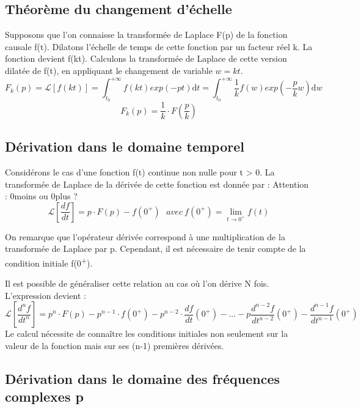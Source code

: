 \documentclass[]{report}
\newcommand{\deriv}{\mathrm{d}}
\begin{document}
	\subsection{Théorème du changement d'échelle}
	
	Supposons que l'on connaisse la transformée de Laplace F(p) de la
	fonction causale f(t). Dilatons l'échelle de temps de cette fonction par
	un facteur réel k. La fonction devient f(kt). Calculons la transformée
	de Laplace de cette version dilatée de f(t), en appliquant le changement
	de variable $w = kt$.
	\begin{equation*}
	F_{k}(p) = \mathcal{L}[f(kt)]=\int_{t_{0}}^{+\infty}f(kt)exp(-pt) \deriv t  =\int_{t_{0}}^{+\infty}\frac{1}{k}f(w)exp(-\frac{p}{k}w) \deriv w 
	\end{equation*}
	\begin{equation}\label{}
	F_{k}(p) = \frac{1}{k}\cdot F(\frac{p}{k})
	\end{equation}
	
	\subsection{Dérivation dans le domaine temporel}
	Considérons le cas d'une fonction f(t) continue non nulle pour t > 0. La transformée de Laplace de la dérivée de cette fonction est donnée par :
	Attention : 0moins ou 0plus ?
	\begin{equation}\label{key}
	\mathcal{L}[\frac{df}{dt}] = p\cdot F(p)-f(0^{+}) ~~~avec~f(0^{+})=\lim_{t\rightarrow0^{+}}f(t)
	\end{equation}

	On remarque que l'opérateur dérivée correspond à une multiplication de
	la transformée de Laplace par p. Cependant, il est nécessaire de tenir
	compte de la condition initiale f(0\textsuperscript{+}).
	
	Il est possible de généraliser cette relation au cas où l'on dérive N
	fois. L'expression devient :
	\begin{equation}\label{key}
	\mathcal{L}[\frac{d^{n}f}{dt^{n}}] = p^{n}\cdot F(p)-p^{n-1}\cdot f(0^{+})-p^{n-2}\cdot \frac{df}{dt}(0^{+})-...-p\frac{d^{n-2}f}{dt^{n-2}}(0^{+})-\frac{d^{n-1}f}{dt^{n-1}}(0^{+})
	\end{equation}
	Le calcul nécessite de connaître les conditions initiales non seulement sur la valeur de la fonction mais sur ses (n-1) premières dérivées.
	
	\subsection{Dérivation dans le domaine des fréquences complexes p}
	
\end{document}
